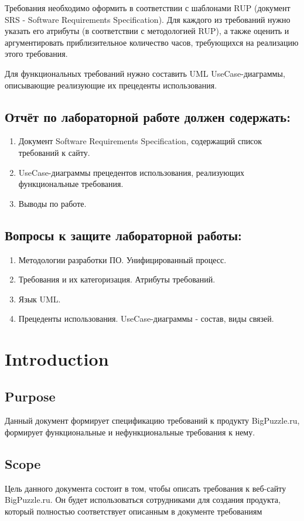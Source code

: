 \documentclass[12pt]{article}
\begin{document}
Требования необходимо оформить в соответствии с шаблонами RUP (документ SRS - Software Requirements Specification). Для каждого из требований нужно указать его атрибуты (в соответствии с методологией RUP), а также оценить и аргументировать приблизительное количество часов, требующихся на реализацию этого требования.

Для функциональных требований нужно составить UML UseCase-диаграммы, описывающие реализующие их прецеденты использования.



\subsection*{Отчёт по лабораторной работе должен содержать:}
\begin{enumerate}[itemsep=0.5ex]
    \item Документ Software Requirements Specification, содержащий список требований к сайту.
    \item UseCase-диаграммы прецедентов использования, реализующих функциональные требования.
    \item Выводы по работе.
\end{enumerate}

\subsection*{Вопросы к защите лабораторной работы:}
\begin{enumerate}[itemsep=0.5ex]
    \item Методологии разработки ПО. Унифицированный процесс.
    \item Требования и их категоризация. Атрибуты требований.
    \item Язык UML.
    \item Прецеденты использования. UseCase-диаграммы - состав, виды связей.
\end{enumerate}

\section{Introduction}
\subsection{Purpose}
Данный документ формирует спецификацию требований к продукту BigPuzzle.ru, формирует функциональные и нефункциональные требования к нему.
\subsection{Scope}
Цель данного документа состоит в том, чтобы описать требования к веб-сайту BigPuzzle.ru. Он будет использоваться сотрудниками для создания продукта, который полностью соответствует описанным в документе требованиям
\end{document}
